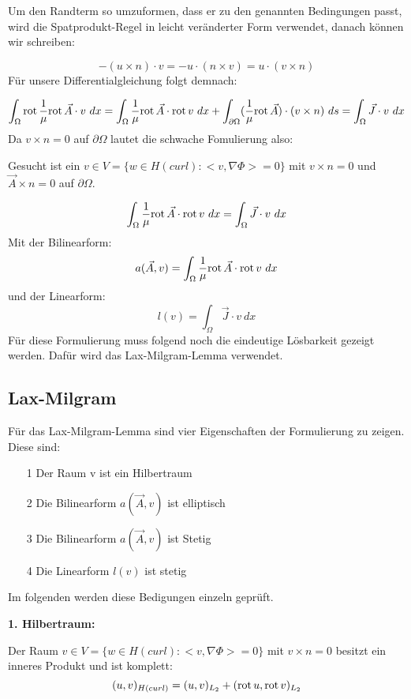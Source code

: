 Um den Randterm so umzuformen, dass er zu den genannten Bedingungen passt, wird die Spatprodukt-Regel in leicht ver\"anderter Form verwendet, danach k\"onnen wir schreiben:
\par
\begin{equation}
	 -(u \times n)\cdot v = -u\cdot (n\times v) = u\cdot(v\times n) 
\end{equation}
F\"ur unsere Differentialgleichung folgt demnach:
\par
\begin{equation}
	\int_\Omega \mathrm{rot}\,\frac{1}{\mu}\mathrm{rot}\, \vec{A}\cdot v ~dx = \int_\Omega \frac{1}{\mu}\mathrm{rot}\, \vec{A} \cdot \mathrm{rot}\, v ~dx + \int_{\partial\Omega} (\frac{1}{\mu} \mathrm{rot}\, \vec{A})\cdot (v \times n) ~ds = \int_\Omega \vec{J}\cdot v ~dx
\end{equation}
Da $v\times n = 0$ auf $\partial\Omega$ lautet die schwache Fomulierung also: \par
Gesucht ist ein $v\in V = \{w \in H(curl): <v,\nabla\Phi> = 0\}$ mit $v\times n = 0$ und $\vec{A}\times n = 0$ auf $\partial\Omega$.
\par
\begin{equation}
	\int_\Omega \frac{1}{\mu}\mathrm{rot}\, \vec{A} \cdot \mathrm{rot}\, v ~dx = \int_\Omega \vec{J}\cdot v ~dx
\end{equation}
Mit der Bilinearform:
\begin{equation}
	a(\vec{A},v) =  \int_\Omega \frac{1}{\mu}\mathrm{rot}\, \vec{A} \cdot \mathrm{rot}\, v ~dx 
\end{equation}
und der Linearform:
\begin{equation}
	l(v) = \int_\Omega \vec{J}\cdot v ~dx
\end{equation}
F\"ur diese Formulierung muss folgend noch die eindeutige L\"osbarkeit gezeigt werden. Daf\"ur wird das Lax-Milgram-Lemma verwendet.

\subsection{Lax-Milgram}
F\"ur das Lax-Milgram-Lemma sind vier Eigenschaften der Formulierung zu zeigen. Diese sind:
\begin{itemize}
	\item[1] Der Raum v ist ein Hilbertraum
	\item[2] Die Bilinearform $a(\vec{A},v)$ ist elliptisch
	\item[3] Die Bilinearform $a(\vec{A},v)$ ist Stetig
	\item[4] Die Linearform $l(v)$ ist stetig
\end{itemize}
Im folgenden werden diese Bedigungen einzeln gepr\"uft.
\par
\textbf{1. Hilbertraum:}\par
Der Raum $v\in V = \{w \in H(curl): <v,\nabla\Phi> = 0\}$ mit $v\times n = 0$ besitzt ein inneres Produkt und ist komplett:
\begin{equation}
	(u,v)_{H(curl)} = (u,v)_{L_2} + (\mathrm{rot}\, u,\mathrm{rot}\, v)_{L_2} 
\end{equation}

